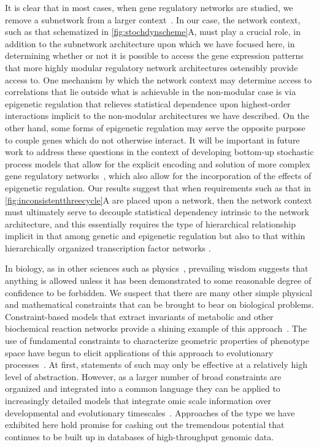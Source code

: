 It is clear that in most cases, when gene regulatory networks are studied, we remove a subnetwork from a larger context~\cite{Alon2007}. In our case, the network context, such as that schematized in \ref{fig:stochdynscheme}A, must play a crucial role, in addition to the subnetwork architecture upon which we have focused here, in determining whether or not it is possible to access the gene expression patterns that more highly modular regulatory network architectures ostensibly provide access to. One mechanism by which the network context may determine access to correlations that lie outside what is achievable in the non-modular case is via epigenetic regulation that relieves statistical dependence upon highest-order interactions implicit to the non-modular architectures we have described. On the other hand, some forms of epigenetic regulation may serve the opposite purpose to couple genes which do not otherwise interact. It will be important in future work to address these questions in the context of developing bottom-up stochastic process models that allow for the explicit encoding and solution of more complex gene regulatory networks~\cite{Walczak2009,Mugler2009}, which also allow for the incorporation of the effects of epigenetic regulation. Our results suggest that when requirements such as that in \ref{fig:inconsistentthreecycle}A are placed upon a network, then the network context must ultimately serve to decouple statistical dependency intrinsic to the network architecture, and this essentially requires the type of hierarchical relationship implicit in that among genetic and epigenetic regulation but also to that within hierarchically organized transcription factor networks \cite{Jothi2009,Bhardwaj2010,Chalancon2012,Colm}.

In biology, as in other sciences such as physics~\cite{Gell-Mann1956}, prevailing wisdom suggests that anything is allowed unless it has been demonstrated to some reasonable degree of confidence to be forbidden. We suspect that there are many other simple physical and mathematical constraints that can be brought to bear on biological problems. Constraint-based models that extract invariants of metabolic and other biochemical reaction networks provide a shining example of this approach~\cite{Karp2012,Bordbar2014}. The use of fundamental constraints to characterize geometric properties of phenotype space have begun to elicit applications of this approach to evolutionary processes~\cite{Shoval2012,Sheftel2013,Jordan2013}. At first, statements of such may only be effective at a relatively high level of abstraction. However, as a larger number of broad constraints are organized and integrated into a common language they can be applied to increasingly detailed models that integrate omic scale information over developmental and evolutionary timescales~\cite{Gunawardena2013}. Approaches of the type we have exhibited here hold promise for cashing out the tremendous potential that continues to be built up in databases of high-throughput genomic data.

